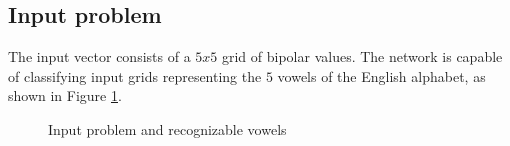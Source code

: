 \subsection{Input problem}\label{ssec:boulder}
The input vector consists of a $5x5$ grid of bipolar values. The network is capable of classifying
input grids representing the $5$ vowels of the English alphabet, as shown in Figure
\ref{fig:charsIn}.

\begin{figure}
    \centering
    \label{fig:charsIn}
    \caption{Input problem and recognizable vowels}
\end{figure}

